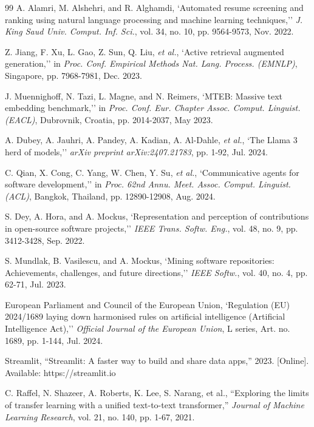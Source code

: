 \documentclass[12pt,a4paper]{report}
\begin{document}
\begin{thebibliography}{99}
A. Alamri, M. Alshehri, and R. Alghamdi, `Automated resume screening and ranking using natural language processing and machine learning techniques,'' \textit{J. King Saud Univ. Comput. Inf. Sci.}, vol. 34, no. 10, pp. 9564-9573, Nov. 2022.

Z. Jiang, F. Xu, L. Gao, Z. Sun, Q. Liu, \textit{et al.}, `Active retrieval augmented generation,'' in \textit{Proc. Conf. Empirical Methods Nat. Lang. Process. (EMNLP)}, Singapore, pp. 7968-7981, Dec. 2023.

J. Muennighoff, N. Tazi, L. Magne, and N. Reimers, `MTEB: Massive text embedding benchmark,'' in \textit{Proc. Conf. Eur. Chapter Assoc. Comput. Linguist. (EACL)}, Dubrovnik, Croatia, pp. 2014-2037, May 2023.

A. Dubey, A. Jauhri, A. Pandey, A. Kadian, A. Al-Dahle, \textit{et al.}, `The Llama 3 herd of models,'' \textit{arXiv preprint arXiv:2407.21783}, pp. 1-92, Jul. 2024.

C. Qian, X. Cong, C. Yang, W. Chen, Y. Su, \textit{et al.}, `Communicative agents for software development,'' in \textit{Proc. 62nd Annu. Meet. Assoc. Comput. Linguist. (ACL)}, Bangkok, Thailand, pp. 12890-12908, Aug. 2024.

S. Dey, A. Hora, and A. Mockus, `Representation and perception of contributions in open-source software projects,'' \textit{IEEE Trans. Softw. Eng.}, vol. 48, no. 9, pp. 3412-3428, Sep. 2022.

S. Mundlak, B. Vasilescu, and A. Mockus, `Mining software repositories: Achievements, challenges, and future directions,'' \textit{IEEE Softw.}, vol. 40, no. 4, pp. 62-71, Jul. 2023.

European Parliament and Council of the European Union, `Regulation (EU) 2024/1689 laying down harmonised rules on artificial intelligence (Artificial Intelligence Act),'' \textit{Official Journal of the European Union}, L series, Art. no. 1689, pp. 1-144, Jul. 2024.

Streamlit, ``Streamlit: A faster way to build and share data apps,'' 2023. [Online]. Available: https://streamlit.io

C. Raffel, N. Shazeer, A. Roberts, K. Lee, S. Narang, et al., ``Exploring the limits of transfer learning with a unified text-to-text transformer,'' \textit{Journal of Machine Learning Research}, vol. 21, no. 140, pp. 1-67, 2021.


\end{thebibliography}
\end{document}
